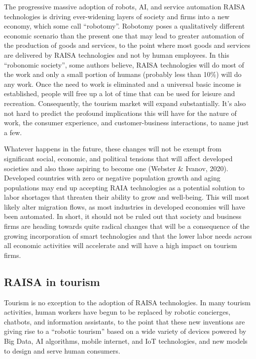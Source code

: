 \documentclass[
  letterpaper,
  DIV=11,
  numbers=noendperiod]{scrreprt}
\begin{document}
The progressive massive adoption of robots, AI, and service automation
RAISA technologies is driving ever-widening layers of society and firms
into a new economy, which some call ``robotomy''. Robotomy poses a
qualitatively different economic scenario than the present one that may
lead to greater automation of the production of goods and services, to
the point where most goods and services are delivered by RAISA
technologies and not by human employees. In this ``robonomic society'',
some authors believe, RAISA technologies will do most of the work and
only a small portion of humans (probably less than 10\%) will do any
work. Once the need to work is eliminated and a universal basic income
is established, people will free up a lot of time that can be used for
leisure and recreation. Consequently, the tourism market will expand
substantially. It's also not hard to predict the profound implications
this will have for the nature of work, the consumer experience, and
customer-business interactions, to name just a few.

Whatever happens in the future, these changes will not be exempt from
significant social, economic, and political tensions that will affect
developed societies and also those aspiring to become one (Webster \&
Ivanov, 2020). Developed countries with zero or negative population
growth and aging populations may end up accepting RAIA technologies as a
potential solution to labor shortages that threaten their ability to
grow and well-being. This will most likely alter migration flows, as
most industries in developed economies will have been automated. In
short, it should not be ruled out that society and business firms are
heading towards quite radical changes that will be a consequence of the
growing incorporation of smart technologies and that the lower labor
needs across all economic activities will accelerate and will have a
high impact on tourism firms.

\hypertarget{raisa-in-tourism}{%
\subsection{RAISA in tourism}\label{raisa-in-tourism}}

Tourism is no exception to the adoption of RAISA technologies. In many
tourism activities, human workers have begun to be replaced by robotic
concierges, chatbots, and information assistants, to the point that
these new inventions are giving rise to a ``robotic tourism'' based on a
wide variety of devices powered by Big Data, AI algorithms, mobile
internet, and IoT technologies, and new models to design and serve human
consumers.
\end{document}
